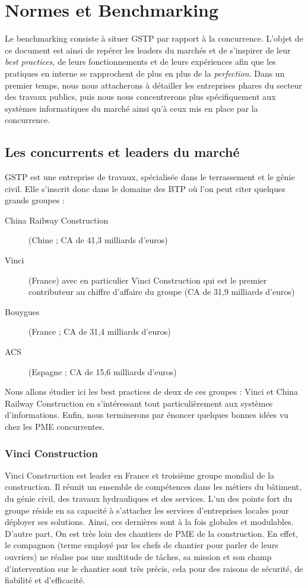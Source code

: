 \section{Normes et Benchmarking}
		
		Le benchmarking consiste à situer GSTP par rapport à la concurrence. L'objet de ce document est ainsi de repérer les leaders du marchés et de s'inspirer de leur \emph{best practices}, de leurs fonctionnements et de leurs expériences afin que les pratiques en interne se rapprochent de plus en plus de la  \emph{perfection}.
Dans un premier temps, nous nous attacherons à détailler les entreprises phares du secteur des travaux publics, puis nous nous concentrerons plus spécifiquement aux systèmes informatiques du marché ainsi qu'à ceux mis en place par la concurrence.

		\subsection{Les concurrents et leaders du marché}
		GSTP est une entreprise de travaux, spécialisée dans le terrassement et le génie civil. Elle s'inscrit donc dans le domaine des BTP où l'on peut citer quelques grands groupes : 
				\begin{description}
				    \item[China Railway Construction] (Chine ; CA de 41,3 milliards d'euros)
				    \item[Vinci] (France) avec en particulier Vinci Construction qui est le premier contributeur au chiffre d'affaire du groupe (CA de 31,9 milliards d'euros)
				    \item[Bouygues] (France ; CA de 31,4 milliards d'euros)
				    \item[ACS] (Espagne ; CA de 15,6 milliards d'euros)
				\end{description}

		Nous allons étudier ici les best practices de deux de ces groupes : Vinci et China Railway Construction en s'intéressant tout particulièrement aux systèmes d'informations. Enfin, nous terminerons par énoncer quelques bonnes idées vu chez les PME concurrentes.

						\subsubsection{Vinci Construction}
						Vinci Construction est leader en France et troisième groupe mondial de la construction.
Il réunit un ensemble de compétences dans les métiers du bâtiment, du génie civil, des travaux hydrauliques et des services.
L'un des points fort du groupe réside en sa capacité à s'attacher les services d'entreprises locales pour déployer ses solutions. Ainsi, ces dernières sont à la fois globales et modulables.
D'autre part, On est très loin des chantiers de PME de la construction. 
En effet, le compagnon (terme employé par les chefs de chantier pour parler de leurs ouvriers) ne réalise pas une multitude de tâches, sa mission et son champ d'intervention sur le chantier sont très précis, cela pour des raisons de sécurité, de fiabilité et d'efficacité.

